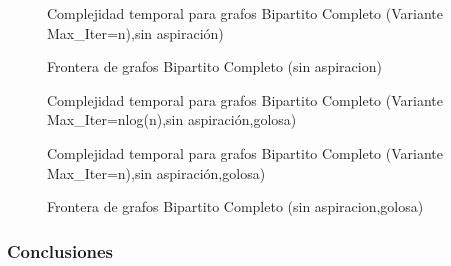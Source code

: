\begin{figure}[H]
    \centering
    \fontsize{8}{10}\selectfont
    \resizebox{0.87\textwidth}{!}{}
    \caption{Complejidad temporal para grafos Bipartito Completo (Variante Max\_Iter=n),sin aspiraci\'on)}
\end{figure}

\begin{figure}[H]
    \centering
    \fontsize{8}{10}\selectfont
    \resizebox{0.87\textwidth}{!}{}
    \caption{Frontera de grafos Bipartito Completo (sin aspiracion)}
\end{figure}

\begin{figure}[H]
    \centering
    \fontsize{8}{10}\selectfont
    \resizebox{0.87\textwidth}{!}{}
    \caption{Complejidad temporal para grafos Bipartito Completo (Variante Max\_Iter=nlog(n),sin aspiraci\'on,golosa)}
\end{figure}

\begin{figure}[H]
    \centering
    \fontsize{8}{10}\selectfont
    \resizebox{0.87\textwidth}{!}{}
    \caption{Complejidad temporal para grafos Bipartito Completo (Variante Max\_Iter=n),sin aspiraci\'on,golosa)}
\end{figure}

\begin{figure}[H]
    \centering
    \fontsize{8}{10}\selectfont
    \resizebox{0.87\textwidth}{!}{}
    \caption{Frontera de grafos Bipartito Completo (sin aspiracion,golosa)}
\end{figure}

\subsubsection{Conclusiones}

